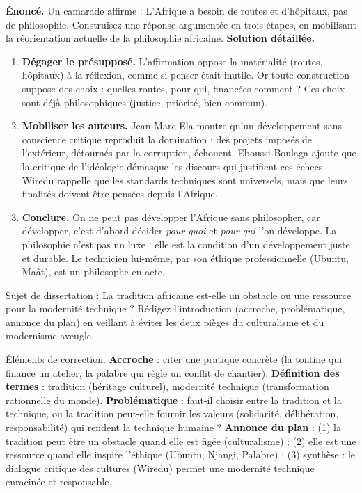 \documentclass[11pt]{article}
\begin{document}
\begin{exoresolu}
\textbf{Énoncé.} Un camarade affirme : \og L'Afrique a besoin de routes et d'hôpitaux, pas de philosophie. \fg{} Construisez une réponse argumentée en trois étapes, en mobilisant la réorientation actuelle de la philosophie africaine.
\tcblower
\textbf{Solution détaillée.}
\begin{enumerate}
\item \textbf{Dégager le présupposé.} L'affirmation oppose la matérialité (routes, hôpitaux) à la réflexion, comme si penser était inutile. Or toute construction suppose des choix : quelles routes, pour qui, financées comment ? Ces choix sont déjà philosophiques (justice, priorité, bien commun).
\item \textbf{Mobiliser les auteurs.} Jean-Marc Ela montre qu'un développement sans conscience critique reproduit la domination : des projets imposés de l'extérieur, détournés par la corruption, échouent. Eboussi Boulaga ajoute que la critique de l'idéologie démasque les discours qui justifient ces échecs. Wiredu rappelle que les standards techniques sont universels, mais que leurs finalités doivent être pensées depuis l'Afrique.
\item \textbf{Conclure.} On ne peut pas développer l'Afrique sans philosopher, car développer, c'est d'abord décider \emph{pour quoi} et \emph{pour qui} l'on développe. La philosophie n'est pas un luxe : elle est la condition d'un développement juste et durable. Le technicien lui-même, par son éthique professionnelle (Ubuntu, Maât), est un philosophe en acte.
\end{enumerate}
\end{exoresolu}

\begin{exercice}
Sujet de dissertation : \og La tradition africaine est-elle un obstacle ou une ressource pour la modernité technique ? \fg{} Rédigez l'introduction (accroche, problématique, annonce du plan) en veillant à éviter les deux pièges du culturalisme et du modernisme aveugle.
\end{exercice}

\begin{corrige}[Exercice]
Éléments de correction. \textbf{Accroche} : citer une pratique concrète (la tontine qui finance un atelier, la palabre qui règle un conflit de chantier). \textbf{Définition des termes} : tradition (héritage culturel), modernité technique (transformation rationnelle du monde). \textbf{Problématique} : faut-il choisir entre la tradition et la technique, ou la tradition peut-elle fournir les valeurs (solidarité, délibération, responsabilité) qui rendent la technique humaine ? \textbf{Annonce du plan} : (1) la tradition peut être un obstacle quand elle est figée (culturalisme) ; (2) elle est une ressource quand elle inspire l'éthique (Ubuntu, Njangi, Palabre) ; (3) synthèse : le dialogue critique des cultures (Wiredu) permet une modernité technique enracinée et responsable.
\end{corrige}
\end{document}
